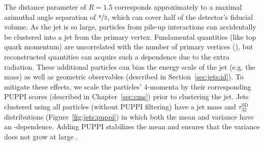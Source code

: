 The distance parameter of $R=1.5$ corresponds approximately to a maximal azimuthal angle separation of $\nicefrac{\pi}{2}$, which can cover half of the detector's fiducial volume.
As the jet is so large, particles from pile-up interactions can accidentally be clustered into a jet from the primary vertex.
Fundamental quantities (like top quark momentum) are uncorrelated with the number of primary vertices (\NPV), but reconstructed quantities can acquire such a dependence due to the extra radiation.
These additional particles can bias the energy scale of the jet (e.g. the mass) as well as geometric observables (described in Section~\ref{sec:jets:id}).
To mitigate these effects, we scale the particles' 4-momenta by their corresponding PUPPI scores (described in Chapter~\ref{sec:cms}) prior to clustering the jet.
Jets clustered using all particles (without PUPPI filtering) have a jet mass and $\tau_{32}^\mathrm{SD}$ distributions (Figure~\ref{fig:jets:puppi}) in which both the mean and variance have an \NPV-dependence.
Adding PUPPI stabilizes the mean and ensures that the variance does not grow at large \NPV.

